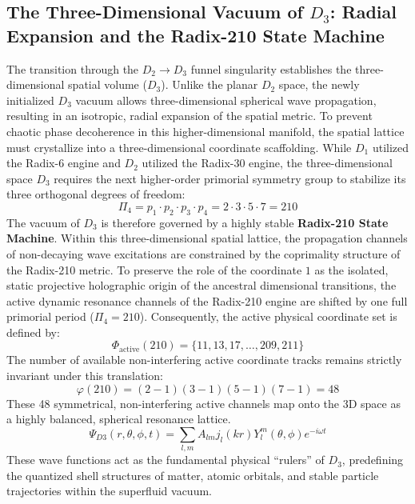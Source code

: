 \documentclass[11pt,a4paper]{article}
\theoremstyle{plain}
\theoremstyle{definition}
\theoremstyle{remark}
\begin{document}
\subsection{The Three-Dimensional Vacuum of $D_3$: Radial Expansion and the Radix-210 State Machine}
The transition through the $D_2 \to D_3$ funnel singularity establishes the three-dimensional spatial volume ($D_3$). Unlike the planar $D_2$ space, the newly initialized $D_3$ vacuum allows three-dimensional spherical wave propagation, resulting in an isotropic, radial expansion of the spatial metric. To prevent chaotic phase decoherence in this higher-dimensional manifold, the spatial lattice must crystallize into a three-dimensional coordinate scaffolding. While $D_1$ utilized the Radix-6 engine and $D_2$ utilized the Radix-30 engine, the three-dimensional space $D_3$ requires the next higher-order primorial symmetry group to stabilize its three orthogonal degrees of freedom:
\begin{equation}
\Pi_4 = p_1 \cdot p_2 \cdot p_3 \cdot p_4 = 2 \cdot 3 \cdot 5 \cdot 7 = 210
\end{equation}
The vacuum of $D_3$ is therefore governed by a highly stable \textbf{Radix-210 State Machine}. Within this three-dimensional spatial lattice, the propagation channels of non-decaying wave excitations are constrained by the coprimality structure of the Radix-210 metric. To preserve the role of the coordinate $1$ as the isolated, static projective holographic origin of the ancestral dimensional transitions, the active dynamic resonance channels of the Radix-210 engine are shifted by one full primorial period ($\Pi_4 = 210$). Consequently, the active physical coordinate set is defined by:
\begin{equation}
\Phi_{\text{active}}(210) = \{11, 13, 17, \dots, 209, 211\}
\end{equation}
The number of available non-interfering active coordinate tracks remains strictly invariant under this translation:
\begin{equation}
\varphi(210) = (2-1)(3-1)(5-1)(7-1) = 48
\end{equation}
These 48 symmetrical, non-interfering active channels map onto the 3D space as a highly balanced, spherical resonance lattice.
\begin{equation}
\Psi_{D3}(r, \theta, \phi, t) = \sum_{l, m} A_{lm} j_l(k r) Y_l^m(\theta, \phi) e^{-i\omega t}
\end{equation}
These wave functions act as the fundamental physical ``rulers'' of $D_3$, predefining the quantized shell structures of matter, atomic orbitals, and stable particle trajectories within the superfluid vacuum.
\end{document}
